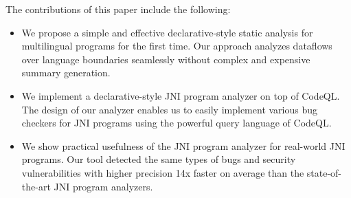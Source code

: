 
%
%
%

The contributions of this paper include the following:

\begin{itemize}
  \item We propose a simple and effective declarative-style static analysis for
    multilingual programs for the first time. Our approach analyzes dataflows
    over language boundaries seamlessly without complex and expensive summary
    generation.

\item We implement a declarative-style JNI program analyzer on top of CodeQL.
  The design of our analyzer enables us to easily implement various bug
    checkers for JNI programs using the powerful query language of CodeQL. 

\item We show practical usefulness of the JNI program analyzer for real-world
  JNI programs. Our tool detected the same types of bugs and security
    vulnerabilities with higher precision 14x faster on average than the
    state-of-the-art JNI program analyzers.
\end{itemize}
